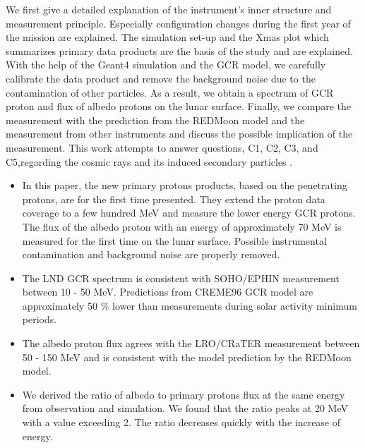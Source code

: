 We first give a detailed explanation of the instrument's inner structure and measurement principle. Especially configuration changes during the first year of the mission are explained. The simulation set-up and the Xmas plot which summarizes primary data products are the basis of the study and are explained.
With the help of the \ac{Geant4} simulation and the \ac{GCR} model, we carefully calibrate the data product and remove the background noise due to the contamination of other particles. As a result, we obtain a spectrum of \ac{GCR} proton and flux of albedo protons on the lunar surface. Finally, we compare the measurement with the prediction from the \ac{REDMoon} model and the measurement from other instruments and discuss the possible implication of the measurement.
This work attempts to answer questions, C1, C2, C3, and C5,regarding the cosmic rays and its induced secondary particles .

\begin{itemize}
    \item   In this paper, the new primary protons products, based on the penetrating protons, are for the first time presented. They extend the proton data coverage to a few hundred MeV and measure the lower energy \ac{GCR} protons. The flux of the albedo proton with an energy of approximately 70 MeV is measured for the first time on the lunar surface. Possible instrumental contamination and background noise are properly removed.
    \item The \ac{LND} \ac{GCR} spectrum is consistent with \ac{SOHO}/\ac{EPHIN} measurement between 10 - 50 MeV.  Predictions from CREME96 \citep{Tylka1997ITNS} \ac{GCR} model are approximately 50 \% lower than measurements during solar activity minimum periods.
    \item  The albedo proton flux agrees with the \ac{LRO}/\ac{CRaTER} measurement between 50 - 150 MeV and is consistent with the model prediction by the \ac{REDMoon} model.
    \item We derived the ratio of albedo to primary protons flux at the same energy from observation and simulation. We found that the ratio peaks at 20 MeV with a value exceeding 2. The ratio decreases quickly with the increase of energy.
\end{itemize}




